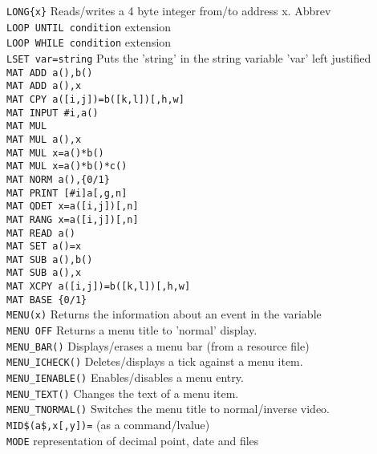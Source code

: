 \begin{tabbing}
\verb|LONG{x}|\>	       Reads/writes a 4 byte integer from/to address x. Abbrev {}\\
\verb|LOOP UNTIL condition|\>     extension\\
\verb|LOOP WHILE condition|\>     extension\\
\verb|LSET var=string|\>  Puts the 'string' in the string variable 'var' left justified\\
\verb|MAT ADD a(),b()|\>\\
\verb|MAT ADD a(),x|\>\\
\verb|MAT CPY a([i,j])=b([k,l])[,h,w]|\>\\
\verb|MAT INPUT #i,a()|\>\\
\verb|MAT MUL|\>\\
\verb|MAT MUL a(),x|\>\\
\verb|MAT MUL x=a()*b()|\>\\
\verb|MAT MUL x=a()*b()*c()|\>\\
\verb|MAT NORM a(),{0/1}|\>\\
\verb|MAT PRINT [#i]a[,g,n]|\>\\
\verb|MAT QDET x=a([i,j])[,n]|\>\\
\verb|MAT RANG x=a([i,j])[,n]|\>\\
\verb|MAT READ a()|\>\\
\verb|MAT SET a()=x|\>\\
\verb|MAT SUB a(),b()|\>\\
\verb|MAT SUB a(),x|\>\\
\verb|MAT XCPY a([i,j])=b([k,l])[,h,w]|\>\\
\verb|MAT BASE {0/1}|\>\\
\verb|MENU(x)|\>	      Returns the information about an event in the variable \\
\verb|MENU OFF|\>        Returns a menu title to 'normal' display.\\
\verb|MENU_BAR()|\>      Displays/erases a menu bar (from a resource file)\\
\verb|MENU_ICHECK()|\>   Deletes/displays a tick against a menu item.\\
\verb|MENU_IENABLE()|\>  Enables/disables a menu entry.\\
\verb|MENU_TEXT()|\>     Changes the text of a menu item.\\
\verb|MENU_TNORMAL()|\>  Switches the menu title to normal/inverse video.\\
\verb|MID$(a$,x[,y])=|\> (as a command/lvalue)\\
\verb|MODE|\>	      representation of decimal point, date and files\\

\end{tabbing}
